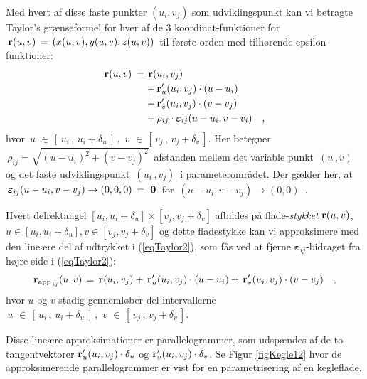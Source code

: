 Med hvert af disse faste punkter $(u_{i}, v_{j})$ som udviklingspunkt kan vi
betragte Taylor's grænseformel for hver af de 3 koordinat-funktioner for $\,{\bf r}(u,
v) \, = \, \left(x(u,v), y(u,v), z(u,v)\right)\, $ til første orden med tilhørende epsilon-funktioner:
\begin{equation} \label{eqTaylor2}
\begin{aligned}
{\bf r}(u, v) \, = \, {\bf r}(& u_{i}, v_{j}) \\
+ \, &{\bf r}'_{u}(u_{i}, v_{j})\cdot(u-u_{i}) \\
+ \, &{\bf r}'_{v}(u_{i}, v_{j})\cdot(v-v_{j}) \\
+ \, &\rho_{ij}\cdot {\bm{\varepsilon}}_{ij}(u-u_{i}, v-v_{i}) \quad
,
\end{aligned}
\end{equation}
hvor  $\, u\, \, \in\, \left[\, u_{i}\, , \,  u_{i} +
\delta_{u}\,\right]\, , \,\, v\, \, \in\, \left[\, v_{j}\, , \,
v_{j} + \delta_{v}\,\right] .$ Her betegner  $\, \rho_{ij} =
\sqrt{(u - u_{i})^{2} + (v - v_{j})^{2}}\, $ afstanden mellem det
variable punkt $\,(u\,, v)\,$ og det faste udviklingspunkt
$\,(u_{i}\,,v_{j})\,$ i parameterområdet. Der gælder her, at
$\,{\bm{\varepsilon}}_{ij}(u-u_{i}, v-v_{j}) \to (0, 0, 0)\, = \
{\bf{0}}\,$ for $\,(u-u_{i}, v-v_{j}) \to (0, 0)\,$ .


Hvert delrektangel $[u_{i}, u_{i}+\delta_{u}]\times[v_{j},
v_{j}+\delta_{v}]$ afbildes på flade-{\em stykket} ${\bf r}(u,v)$,
$u \in[u_{i}, u_{i}+\delta_{u}], v \in[v_{j}, v_{j}+\delta_{v}]$ og
dette fladestykke kan vi approksimere med den lineære del af
udtrykket i (\ref{eqTaylor2}), som fås ved at fjerne
${\bm{\varepsilon}}_{ij}$-bidraget fra højre side i
(\ref{eqTaylor2}):
\begin{equation}\label{eqApp2}
{\bf r}_{\operatorname{app}_{\,ij}}(u, v) \, = \, {\bf r}(u_{i}, v_{j}) + \, {\bf
r}'_{u}(u_{i}, v_{j})\cdot (u - u_{i}) + \, {\bf r}'_{v}(u_{i},
v_{j})\cdot (v - v_{j}) \quad ,
\end{equation}
hvor $u$ og $v$ stadig gennemløber del-intervallerne $\, u\, \,
\in\, \left[\, u_{i}\, , \,  u_{i} + \delta_{u}\,\right]\, , \,\,
v\, \, \in\, \left[\, v_{j}\, , \, v_{j} + \delta_{v}\,\right] .$


 Disse lineære approksimationer er parallelogrammer,
som udspændes af de to tangentvektorer ${\bf
r}'_{u}(u_{i}, v_{j})\cdot\delta_{u}$ og ${\bf
r}'_{v}(u_{i}, v_{j})\cdot \delta_{v}$. Se Figur
\ref{figKegle12} hvor de approksimerende
parallelogrammer er vist for en parametrisering
af en kegleflade.


